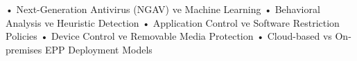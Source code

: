 • Next-Generation Antivirus (NGAV) ve Machine Learning
• Behavioral Analysis ve Heuristic Detection
• Application Control ve Software Restriction Policies
• Device Control ve Removable Media Protection
• Cloud-based vs On-premises EPP Deployment Models